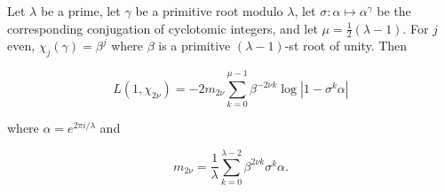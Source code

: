Let $\lambda$ be a prime, let $\gamma$ be a primitive root modulo $\lambda$, let $\sigma: \alpha \mapsto \alpha^\gamma$ be the corresponding conjugation of cyclotomic integers, and let $\mu = \frac{1}{2}(\lambda - 1)$. For $j$ even, $\chi_j(\gamma) = \beta^j$ where $\beta$ is a primitive $(\lambda-1)$-st root of unity. Then

$$L(1, \chi_{2\nu}) = -2 m_{2\nu} \sum_{k=0}^{\mu-1} \beta^{-2\nu k} \log |1 - \sigma^k \alpha|$$

where $\alpha = e^{2\pi i/\lambda}$ and

$$m_{2\nu} = \frac{1}{\lambda} \sum_{k=0}^{\lambda-2} \beta^{2\nu k} \sigma^k \alpha.$$
